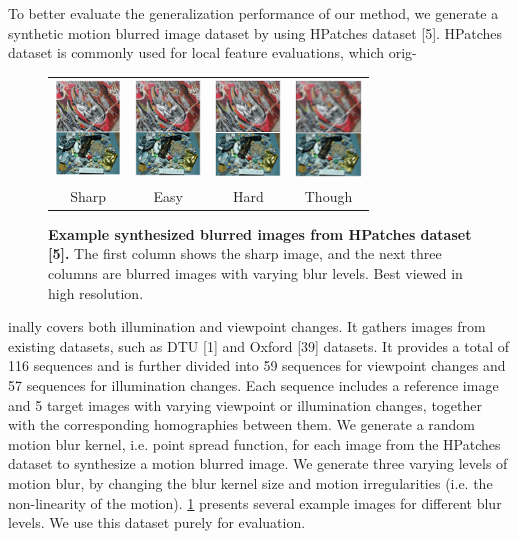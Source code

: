 \documentclass[10pt,twocolumn,letterpaper]{article}
\begin{document}
To better evaluate the generalization performance of our method, we generate a synthetic motion blurred image dataset by using HPatches dataset [5]. HPatches dataset is commonly used for local feature evaluations, which orig-
\begin{figure}[H]
    \centering
    \begin{tabular}{cccc}
         \includegraphics[width=1.75cm]{images/fig_tab1.png} & \includegraphics[width=1.75cm]{images/fig_tab2.png} & \includegraphics[width=1.75cm]{images/fig_tab3.png} & \includegraphics[width=1.75cm]{images/fig_tab4.png}\\
         Sharp & Easy & Hard & Though \\
    \end{tabular}
    \caption{\textbf{Example synthesized blurred images from HPatches dataset [5].} The first column shows the sharp image, and the next three columns are blurred images with varying blur levels. Best viewed in high resolution.}
    \label{fig:Fig4}
\end{figure}
\noindent inally covers both illumination and viewpoint changes. It gathers images from existing datasets, such as DTU [1] and Oxford [39] datasets. It provides a total of 116 sequences and is further divided into 59 sequences for viewpoint changes and 57 sequences for illumination changes. Each sequence includes a reference image and 5 target images with varying viewpoint or illumination changes, together with the corresponding homographies between them. We generate a random motion blur kernel, i.e. point spread function, for each image from the HPatches dataset to synthesize a motion blurred image. We generate three varying levels of motion blur, by changing the blur kernel size and motion irregularities (i.e. the non-linearity of the motion). \cref{fig:Fig4} presents several example images for different blur levels. We use this dataset purely for evaluation.
\end{document}
